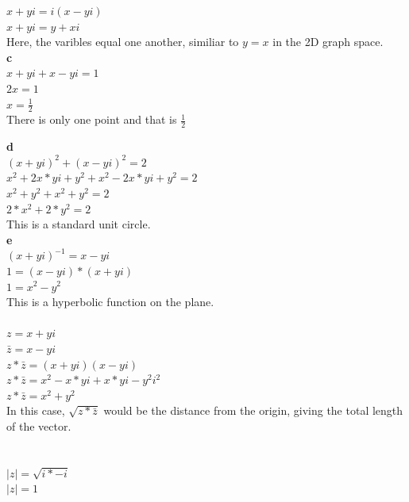 \documentclass[12pt]{article}
\begin{document}
$x + yi = i(x - yi)$\\
$x + yi = y + xi$\\

Here, the varibles equal one another, similiar to $y = x$ in the 2D graph space.\\

{\bf c}\\

$x + yi + x - yi = 1$\\
$2x = 1$\\
$x = \frac{1}{2}$\\

There is only one point and that is $\frac{1}{2}$

{\bf d}\\

$(x + yi)^2 + (x - yi)^2 = 2$\\
$x^2 + 2x*yi + y^2 + x^2 - 2x*yi + y^2 = 2$\\
$x^2 + y^2 + x^2 + y^2 = 2$\\
$2*x^2 + 2*y^2  = 2$\\

This is a standard unit circle.\\

{\bf e}\\

$(x+yi)^{-1} = x - yi$\\
$1 = (x - yi) * (x+yi)$\\
$1 = x^2 - y^2 $\\

This is a hyperbolic function on the plane.\\

\\

$z = x + yi$\\
$\bar{z} = x - yi$\\


$z*\bar{z} = (x + yi)(x - yi)$\\
$z*\bar{z} = x^2 - x*yi + x*yi - y^2i^2$\\
$z*\bar{z} = x^2 + y^2$\\

In this case, $\sqrt{z*\bar{z}}$ would be the distance from the origin, giving the total length of the vector.\\


\\

\\
$|z| = \sqrt{i*-i}$\\
$|z| = 1$\\
\end{document}
